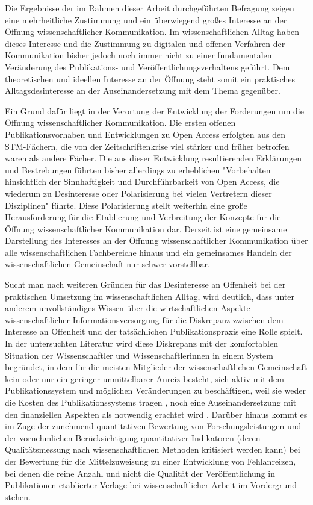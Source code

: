 Die Ergebnisse der im Rahmen dieser Arbeit durchgeführten Befragung zeigen eine mehrheitliche Zustimmung und ein überwiegend großes Interesse an der Öffnung wissenschaftlicher Kommunikation. Im wissenschaftlichen Alltag haben dieses Interesse und die Zustimmung zu digitalen und offenen Verfahren der Kommunikation bisher jedoch noch immer nicht zu einer fundamentalen Veränderung des Publikations- und Veröffentlichungsverhaltens geführt. Dem theoretischen und ideellen Interesse an der Öffnung steht somit ein praktisches Alltagsdesinteresse an der Auseinandersetzung mit dem Thema gegenüber.

Ein Grund dafür liegt in der Verortung der Entwicklung der Forderungen um die Öffnung wissenschaftlicher Kommunikation. Die ersten offenen Publikationsvorhaben und Entwicklungen zu Open Access erfolgten aus den STM-Fächern, die von der Zeitschriftenkrise viel stärker und früher betroffen waren als andere Fächer. Die aus dieser Entwicklung resultierenden Erklärungen und Bestrebungen führten bisher allerdings zu erheblichen "Vorbehalten hinsichtlich der Sinnhaftigkeit und Durchführbarkeit von Open Access, die wiederum zu Desinteresse oder Polarisierung bei vielen Vertretern dieser Disziplinen" \cite{Naeder_2010} führte. Diese Polarisierung stellt weiterhin eine große Herausforderung für die Etablierung und Verbreitung der Konzepte für die Öffnung wissenschaftlicher Kommunikation dar. Derzeit ist eine gemeinsame Darstellung des Interesses an der Öffnung wissenschaftlicher Kommunikation über alle wissenschaftlichen Fachbereiche hinaus und ein gemeinsames Handeln der wissenschaftlichen Gemeinschaft nur schwer vorstellbar.

Sucht man nach weiteren Gründen für das Desinteresse an Offenheit bei der praktischen Umsetzung im wissenschaftlichen Alltag, wird deutlich, dass unter anderem unvollständiges Wissen über die wirtschaftlichen Aspekte wissenschaftlicher Informationsversorgung für die Diskrepanz zwischen dem Interesse an Offenheit und der tatsächlichen Publikationspraxis eine Rolle spielt. In der untersuchten Literatur wird diese Diskrepanz mit der komfortablen Situation der Wissenschaftler und Wissenschaftlerinnen in einem System begründet, in dem für die meisten Mitglieder der wissenschaftlichen Gemeinschaft kein oder nur ein geringer unmittelbarer Anreiz besteht, sich aktiv mit dem Publikationssystem und möglichen Veränderungen zu beschäftigen, weil sie weder die Kosten des Publikationssystems tragen \cite{Sietmann_2007}, noch eine Auseinandersetzung mit den finanziellen Aspekten als notwendig erachtet wird \cite{Herb_2010}. Darüber hinaus kommt es im Zuge der zunehmend quantitativen Bewertung von Forschungsleistungen und der vornehmlichen Berücksichtigung quantitativer Indikatoren (deren Qualitätsmessung nach wissenschaftlichen Methoden kritisiert werden kann) bei der Bewertung für die Mittelzuweisung zu einer Entwicklung von Fehlanreizen, bei denen die reine Anzahl und nicht die Qualität der Veröffentlichung in Publikationen etablierter Verlage bei wissenschaftlicher Arbeit im Vordergrund stehen.

